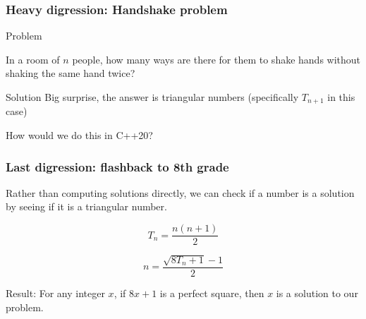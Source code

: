 \documentclass{beamer}
\begin{document}
\begin{frame}
\frametitle{Heavy digression: Handshake problem}
{
\begin{block}{Problem}

In a room of $n$ people, how many ways are there for them to shake hands without shaking the same hand twice?
\end{block}

\begin{block}{Solution}
Big surprise, the answer is triangular numbers (specifically $T_{n+1}$ in this case)
\end{block}
}

\vspace{2em} 

How would we do this in C++20?
\end{frame}

\begin{frame}
\frametitle{Last digression: flashback to 8th grade}
Rather than computing solutions directly, we can check if a number is a solution by seeing if it is a triangular number.

\begin{equation}\tag{Formula for finding triangular numbers}
T_n = \frac{n(n+1)}{2}
\end{equation}

\begin{equation}\tag{Inverse of the formula above}
n = \frac{\sqrt{8T_n + 1} - 1}{2}
\end{equation}

\vspace{2em}

Result: For any integer $x$, if $8x+1$ is a perfect square, then $x$ is a solution to our problem.

\end{frame}
\end{document}
